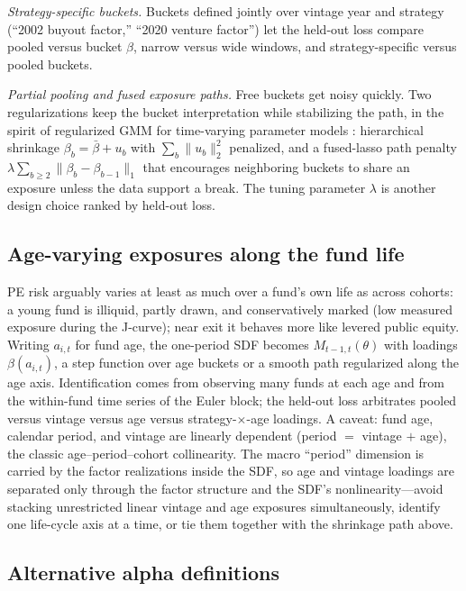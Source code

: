 \documentclass[11pt]{article}
\begin{document}
\emph{Strategy-specific buckets.} Buckets defined jointly over vintage year and strategy (``2002 buyout factor,'' ``2020 venture factor'') let the held-out loss compare pooled versus bucket \(\beta\), narrow versus wide windows, and strategy-specific versus pooled buckets.

\emph{Partial pooling and fused exposure paths.} Free buckets get noisy quickly. Two regularizations keep the bucket interpretation while stabilizing the path, in the spirit of regularized GMM for time-varying parameter models \citep{CuiFengHong2024}: hierarchical shrinkage \(\beta_b=\bar\beta+u_b\) with \(\sum_b\|u_b\|_2^2\) penalized, and a fused-lasso path penalty \(\lambda\sum_{b\ge 2}\|\beta_b-\beta_{b-1}\|_1\) that encourages neighboring buckets to share an exposure unless the data support a break. The tuning parameter \(\lambda\) is another design choice ranked by held-out loss.

\subsection{Age-varying exposures along the fund life}
\label{app:age_betas}

PE risk arguably varies at least as much over a fund's own life as across cohorts: a young fund is illiquid, partly drawn, and conservatively marked (low measured exposure during the J-curve); near exit it behaves more like levered public equity. Writing \(a_{i,t}\) for fund age, the one-period SDF becomes \(M_{t-1,t}(\theta)\) with loadings \(\beta(a_{i,t})\), a step function over age buckets or a smooth path regularized along the age axis. Identification comes from observing many funds at each age and from the within-fund time series of the Euler block; the held-out loss arbitrates pooled versus vintage versus age versus strategy-\(\times\)-age loadings. A caveat: fund age, calendar period, and vintage are linearly dependent (period \(=\) vintage \(+\) age), the classic age--period--cohort collinearity. The macro ``period'' dimension is carried by the factor realizations inside the SDF, so age and vintage loadings are separated only through the factor structure and the SDF's nonlinearity---avoid stacking unrestricted linear vintage and age exposures simultaneously, identify one life-cycle axis at a time, or tie them together with the shrinkage path above.

\subsection{Alternative alpha definitions}
\label{app:alt_alpha}
\end{document}
